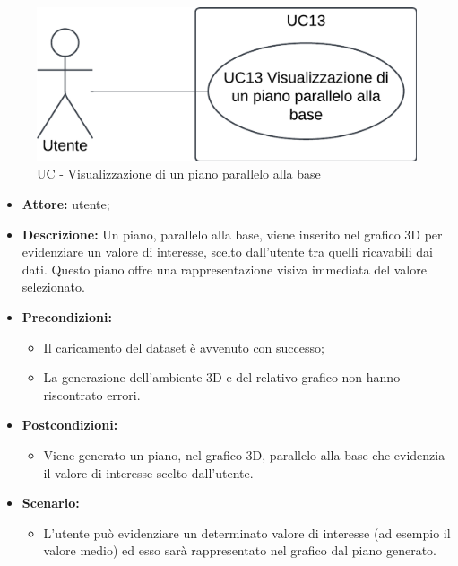 \begin{figure}[h!]\centering
    \includegraphics[scale=0.7]{template/images/UC13.png}
    \caption{UC - Visualizzazione di un piano parallelo alla base}
\end{figure}
\begin{itemize}    
    \item \textbf{Attore:} utente;
    \item \textbf{Descrizione:} Un piano, parallelo alla base, viene inserito nel grafico 3D per evidenziare un valore di interesse, scelto dall'utente tra quelli ricavabili dai dati. Questo piano offre una rappresentazione visiva immediata del valore selezionato.
    \item \textbf{Precondizioni:}    
        \begin{itemize}
            \item Il caricamento del dataset è avvenuto con successo;
            \item La generazione dell'ambiente 3D e del relativo grafico non hanno riscontrato errori.
        \end{itemize}    
    \item \textbf{Postcondizioni:}
        \begin{itemize}
            \item Viene generato un piano, nel grafico 3D, parallelo alla base che evidenzia il valore di interesse scelto dall'utente.
        \end{itemize}    
    \item \textbf{Scenario:} 
        \begin{itemize}
            \item L'utente può evidenziare un determinato valore di interesse (ad esempio il valore medio) ed esso sarà rappresentato nel grafico dal piano generato.
        \end{itemize}
\end{itemize}

